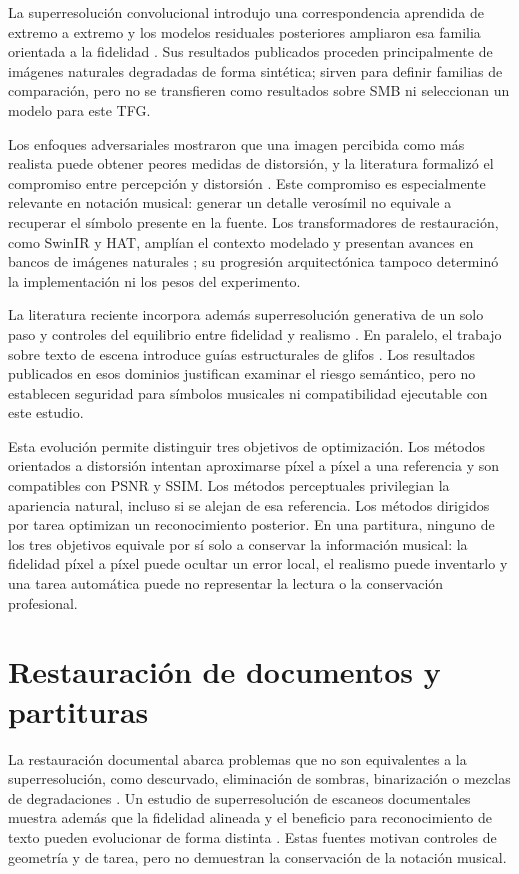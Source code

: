 La superresolución convolucional introdujo una correspondencia aprendida de extremo a extremo y
los modelos residuales posteriores ampliaron esa familia orientada a la fidelidad
\cite{dong2015srcnn,lim2017edsr}. Sus resultados publicados proceden principalmente de imágenes
naturales degradadas de forma sintética; sirven para definir familias de comparación, pero no se
transfieren como resultados sobre SMB ni seleccionan un modelo para este TFG.

Los enfoques adversariales mostraron que una imagen percibida como más realista puede obtener peores
medidas de distorsión, y la literatura formalizó el compromiso entre percepción y distorsión
\cite{ledig2017srgan,blau2018perception,wang2018esrgan}.
Este compromiso es especialmente relevante en notación musical: generar un detalle verosímil no
equivale a recuperar el símbolo presente en la fuente. Los transformadores de restauración, como
SwinIR y HAT, amplían el contexto modelado y presentan avances en bancos de imágenes naturales
\cite{liang2021swinir,chen2023hat}; su progresión arquitectónica tampoco determinó la
implementación ni los pesos del experimento.

La literatura reciente incorpora además superresolución generativa de un solo paso y controles del
equilibrio entre fidelidad y realismo \cite{kim2026fidesr,zhang2026tadsr}. En paralelo, el trabajo
sobre texto de escena introduce guías estructurales de glifos \cite{luo2026tiger}. Los resultados
publicados en esos dominios justifican examinar el riesgo semántico, pero no establecen seguridad
para símbolos musicales ni compatibilidad ejecutable con este estudio.

Esta evolución permite distinguir tres objetivos de optimización. Los métodos orientados a
distorsión intentan aproximarse píxel a píxel a una referencia y son compatibles con PSNR y SSIM.
Los métodos perceptuales privilegian la apariencia natural, incluso si se alejan de esa referencia.
Los métodos dirigidos por tarea optimizan un reconocimiento posterior. En una partitura, ninguno de
los tres objetivos equivale por sí solo a conservar la información musical: la fidelidad píxel a
píxel puede ocultar un error local, el realismo puede inventarlo y una tarea automática puede no
representar la lectura o la conservación profesional.

\section{Restauración de documentos y partituras}
La restauración documental abarca problemas que no son equivalentes a la superresolución, como
descurvado, eliminación de sombras, binarización o mezclas de degradaciones
\cite{zhang2024docres,li2026mmdir}. Un estudio de superresolución de escaneos documentales muestra
además que la fidelidad alineada y el beneficio para reconocimiento de texto pueden evolucionar de
forma distinta \cite{zyrek2025document}. Estas fuentes motivan controles de geometría y de tarea,
pero no demuestran la conservación de la notación musical.

